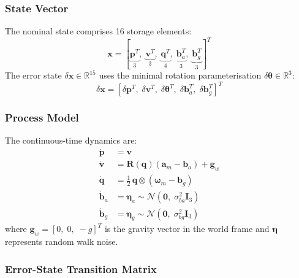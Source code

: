 \subsubsection{State Vector}

The nominal state comprises 16 storage elements:
\begin{equation}
  \mathbf{x} = [\underbrace{\mathbf{p}^T}_{3},\; \underbrace{\mathbf{v}^T}_{3},\; \underbrace{\mathbf{q}^T}_{4},\; \underbrace{\mathbf{b}_a^T}_{3},\; \underbrace{\mathbf{b}_g^T}_{3}]^T
\end{equation}
The error state $\delta\mathbf{x} \in \mathbb{R}^{15}$ uses the minimal rotation parameterisation $\delta\boldsymbol{\theta} \in \mathbb{R}^3$:
\begin{equation}
  \delta\mathbf{x} = [\delta\mathbf{p}^T,\; \delta\mathbf{v}^T,\; \delta\boldsymbol{\theta}^T,\; \delta\mathbf{b}_a^T,\; \delta\mathbf{b}_g^T]^T
\end{equation}

\subsubsection{Process Model}

The continuous-time dynamics are:
\begin{align}
  \dot{\mathbf{p}} &= \mathbf{v} \\
  \dot{\mathbf{v}} &= \mathbf{R}(\mathbf{q})(\mathbf{a}_m - \mathbf{b}_a) + \mathbf{g}_w \label{eq:vdot}\\
  \dot{\mathbf{q}} &= \tfrac{1}{2}\,\mathbf{q} \otimes (\boldsymbol{\omega}_m - \mathbf{b}_g) \\
  \dot{\mathbf{b}}_a &= \boldsymbol{\eta}_a \sim \mathcal{N}(\mathbf{0},\; \sigma_{ba}^2 \mathbf{I}_3) \\
  \dot{\mathbf{b}}_g &= \boldsymbol{\eta}_g \sim \mathcal{N}(\mathbf{0},\; \sigma_{bg}^2 \mathbf{I}_3)
\end{align}
where $\mathbf{g}_w = [0,\; 0,\; -g]^T$ is the gravity vector in the world frame and $\boldsymbol{\eta}$ represents random walk noise.

\subsubsection{Error-State Transition Matrix}

